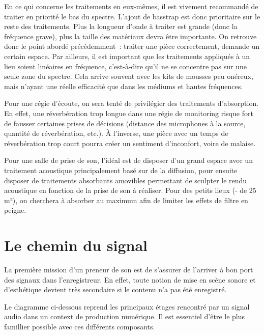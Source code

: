 \documentclass[
]{book}
\begin{document}
En ce qui concerne les traitements en eux-mêmes, il est vivement recommandé de traiter en priorité le bas du spectre. L'ajout de basstrap est donc prioritaire sur le reste des traitements. Plus la longueur d'onde à traiter est grande (donc la fréquence grave), plus la taille des matériaux devra être importante. On retrouve donc le point abordé précédemment~: traiter une pièce correctement, demande un certain espace. Par ailleurs, il est important que les traitements appliqués à un lieu soient linéaires en fréquence, c'est-à-dire qu'il ne se concentre pas sur une seule zone du spectre. Cela arrive souvent avec les kits de mousses peu onéreux, mais n'ayant une réelle efficacité que dans les médiums et hautes fréquences.

Pour une régie d'écoute, on sera tenté de privilégier des traitements d'absorption. En effet, une réverbération trop longue dans une régie de monitoring risque fort de fausser certaines prises de décisions (distance des microphones à la source, quantité de réverbération, etc.). À l'inverse, une pièce avec un temps de réverbération trop court pourra créer un sentiment d'inconfort, voire de malaise.

Pour une salle de prise de son, l'idéal est de disposer d'un grand espace avec un traitement acoustique principalement basé sur de la diffusion, pour ensuite disposer de traitements absorbants amovibles permettant de sculpter le rendu acoustique en fonction de la prise de son à réaliser. Pour des petits lieux (- de 25 m²), on cherchera à absorber au maximum afin de limiter les effets de filtre en peigne.

\hypertarget{le-chemin-du-signal}{%
\chapter{Le chemin du signal}\label{le-chemin-du-signal}}

La première mission d'un preneur de son est de s'assurer de l'arriver à bon port des signaux dans l'enregistreur. En effet, toute notion de mise en scène sonore et d'esthétique devient très secondaire si le contenu n'a pas été enregistré.

Le diagramme ci-dessous reprend les principaux étages rencontré par un signal audio dans un context de production numérique. Il est essentiel d'être le plus famillier possible avec ces différents composants.
\end{document}
